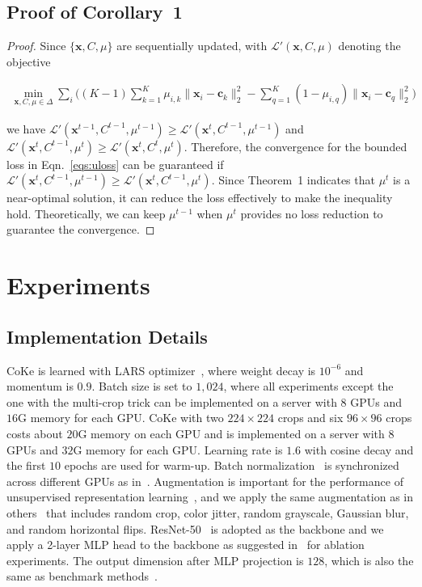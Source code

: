 \documentclass[10pt,twocolumn,letterpaper]{article}
\def \x {\mathbf{x}}
\def \cc {\mathbf{c}}
\def \LL {\mathcal{L}}
\begin{document}
\subsection{Proof of Corollary~1}
\begin{proof}
Since $\{\x,C,\mu\}$ are sequentially updated, with $\LL'(\x,C, \mu)$ denoting the objective
\begin{scriptsize}
\begin{align}\label{eqs:uloss}
\min_{\x, C, \mu\in\Delta}  \sum_{i}\Big((K-1)\sum_{k=1}^K \mu_{i,k}\|\x_i-\cc_k\|_2^2-  \sum_{q=1}^K(1-\mu_{i,q})\|\x_i-\cc_q\|_2^2\Big)
\end{align}
\end{scriptsize}
we have $\LL'(\x^{t-1},C^{t-1},\mu^{t-1})\geq \LL'(\x^t,C^{t-1},\mu^{t-1})$ and $\LL'(\x^{t},C^{t-1},\mu^{t})\geq \LL'(\x^t,C^{t},\mu^{t})$. Therefore, the convergence for the bounded loss in Eqn.~\ref{eqs:uloss} can be guaranteed if $\LL'(\x^{t},C^{t-1},\mu^{t-1})\geq \LL'(\x^t,C^{t-1},\mu^{t})$. Since Theorem~1 indicates that $\mu^t$ is a near-optimal solution, it can reduce the loss effectively to make the inequality hold. Theoretically, we can keep $\mu^{t-1}$ when $\mu^t$ provides no loss reduction to guarantee the convergence.
\end{proof}

\section{Experiments}
\subsection{Implementation Details}
CoKe is learned with LARS optimizer~\cite{abs-1708-03888}, where weight decay is $10^{-6}$ and momentum is $0.9$. Batch size is set to $1,024$, where all experiments except the one with the multi-crop trick can be implemented on a server with $8$ GPUs and $16$G memory for each GPU. CoKe with two $224\times 224$ crops and six $96\times 96$ crops costs about $20$G memory on each GPU and is implemented on a server with $8$ GPUs and $32$G memory for each GPU. Learning rate is $1.6$ with cosine decay and the first $10$ epochs are used for warm-up. Batch normalization~\cite{IoffeS15} is synchronized across different GPUs as in~\cite{CaronMMGBJ20,ChenK0H20}. Augmentation is important for the performance of unsupervised representation learning~\cite{abs-2003-04297}, and we apply the same augmentation as in others~\cite{CaronMMGBJ20,ChenK0H20} that includes random crop, color jitter, random grayscale, Gaussian blur, and random horizontal flips. ResNet-50~\cite{HeZRS16} is adopted as the backbone and we apply a 2-layer MLP head to the backbone as suggested in~\cite{ChenK0H20,abs-2003-04297} for ablation experiments. The output dimension after MLP projection is $128$, which is also the same as benchmark methods~\cite{CaronMMGBJ20,ChenK0H20,abs-2003-04297}. 
\end{document}
